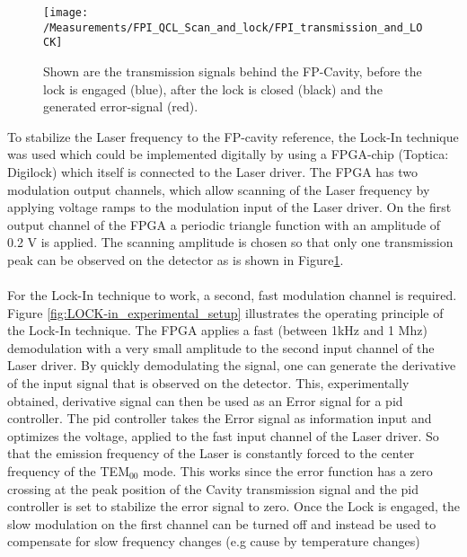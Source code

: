 \begin{figure}[H]
	\centering
	\texttt{[image: /Measurements/FPI\_QCL\_Scan\_and\_lock/FPI\_transmission\_and\_LOCK]}
	\caption{Shown are the transmission signals behind the FP-Cavity, before the lock is engaged (blue), after the lock is closed (black) and the generated error-signal (red).}
	\label{fig:QCL_FPI_tranmission}
\end{figure}
\noindent
To stabilize the Laser frequency to the FP-cavity reference, the Lock-In technique was used which could be implemented digitally by using a FPGA-chip (Toptica: Digilock) which itself is connected to the Laser driver. The FPGA has two modulation output channels, which allow scanning of the Laser frequency by applying voltage ramps to the modulation input of the Laser driver. On the first output channel of the FPGA a periodic triangle function with an amplitude of 0.2 V is applied. The scanning amplitude is chosen so that only one transmission peak can be observed on the detector as is shown in Figure\ref{fig:QCL_FPI_tranmission}. \\\\
\noindent
For the Lock-In technique to work, a second, fast modulation channel is required. Figure \ref{fig:LOCK-in_experimental_setup} illustrates the operating principle of the Lock-In technique. The FPGA applies a fast (between 1kHz and 1 Mhz) demodulation with a very small amplitude to the second input channel of the Laser driver. By quickly demodulating the signal, one can generate the derivative of the input signal that is observed on the detector. This, experimentally obtained, derivative signal can then be used as an Error signal for a pid controller. The pid controller takes the Error signal as information input and optimizes the voltage, applied to the fast input channel of the Laser driver. So that the emission frequency of the Laser is constantly forced to the center frequency of the TEM$_{00}$ mode. This  works since the error function has a zero crossing at the peak position of the Cavity transmission signal and the pid controller is set to stabilize the error signal to zero. Once the Lock is engaged, the slow modulation on the first channel can be turned off and instead be used to compensate for slow frequency changes (e.g cause by temperature changes)\\\\

